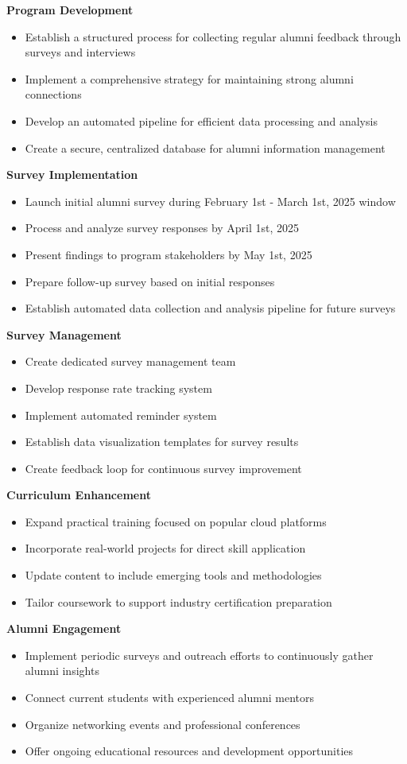 \documentclass[12pt,a4paper]{article}
\begin{document}
\noindent\textbf{Program Development}
\begin{itemize}
\item Establish a structured process for collecting regular alumni feedback through surveys and interviews
\item Implement a comprehensive strategy for maintaining strong alumni connections
\item Develop an automated pipeline for efficient data processing and analysis
\item Create a secure, centralized database for alumni information management
\end{itemize}
\textbf{Survey Implementation}
\begin{itemize}
\item Launch initial alumni survey during February 1st - March 1st, 2025 window
\item Process and analyze survey responses by April 1st, 2025
\item Present findings to program stakeholders by May 1st, 2025
\item Prepare follow-up survey based on initial responses
\item Establish automated data collection and analysis pipeline for future surveys
\end{itemize}
\textbf{Survey Management}
\begin{itemize}
\item Create dedicated survey management team
\item Develop response rate tracking system
\item Implement automated reminder system
\item Establish data visualization templates for survey results
\item Create feedback loop for continuous survey improvement
\end{itemize}
\textbf{Curriculum Enhancement}
\begin{itemize}
\item Expand practical training focused on popular cloud platforms
\item Incorporate real-world projects for direct skill application
\item Update content to include emerging tools and methodologies
\item Tailor coursework to support industry certification preparation
\end{itemize}
\textbf{Alumni Engagement}
\begin{itemize}
\item Implement periodic surveys and outreach efforts to continuously gather alumni insights
\item Connect current students with experienced alumni mentors
\item Organize networking events and professional conferences
\item Offer ongoing educational resources and development opportunities
\end{itemize}
\end{document}
